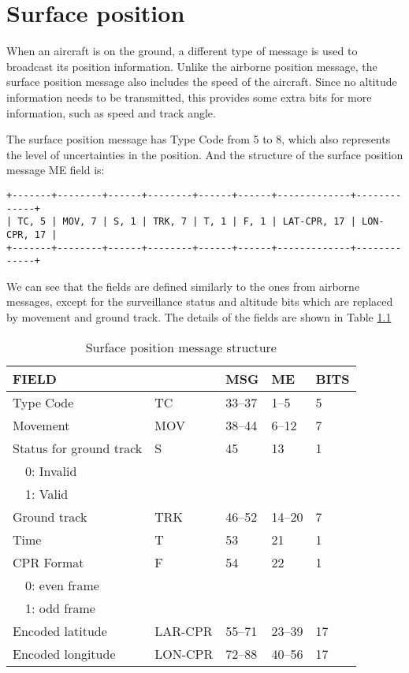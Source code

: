 \chapter{Surface position}

When an aircraft is on the ground, a different type of message is used to broadcast its position information. Unlike the airborne position message, the surface position message also includes the speed of the aircraft. Since no altitude information needs to be transmitted, this provides some extra bits for more information, such as speed and track angle.

The surface position message has Type Code from 5 to 8, which also represents the level of uncertainties in the position. And the structure of the surface position message ME field is:


\begin{verbatim}
+-------+--------+------+--------+------+------+-------------+-------------+
| TC, 5 | MOV, 7 | S, 1 | TRK, 7 | T, 1 | F, 1 | LAT-CPR, 17 | LON-CPR, 17 |
+-------+--------+------+--------+------+------+-------------+-------------+
\end{verbatim}

We can see that the fields are defined similarly to the ones from airborne messages, except for the surveillance status and altitude bits which are replaced by movement and ground track. The details of the fields are shown in Table \ref{tb:adsb-surf-pos-fields}

\begin{table}[ht]
\caption{Surface position message structure}
\label{tb:adsb-surf-pos-fields}
\begin{tabular}{|l|l|l|l|l|}
\hline
\textbf{FIELD} & \textbf{} & \textbf{MSG} & \textbf{ME} & \textbf{BITS} \\ \hline
Type Code & TC & 33--37 & 1--5 & 5 \\ \hline
Movement & MOV & 38--44 & 6--12 & 7 \\ \hline
Status for ground track & S & 45 & 13 & 1\\
~~0: Invalid & & & &\\
~~1: Valid & & & &\\ \hline
Ground track & TRK & 46--52 & 14--20 & 7 \\ \hline
Time & T & 53 & 21 & 1 \\ \hline
CPR Format  & F & 54 & 22 & 1\\
~~0: even frame & & & &\\
~~1: odd frame & & & &\\ \hline
Encoded latitude & LAR-CPR & 55--71 & 23--39 & 17 \\ \hline
Encoded longitude & LON-CPR & 72--88 & 40--56 & 17 \\ \hline
\end{tabular}
\end{table}

